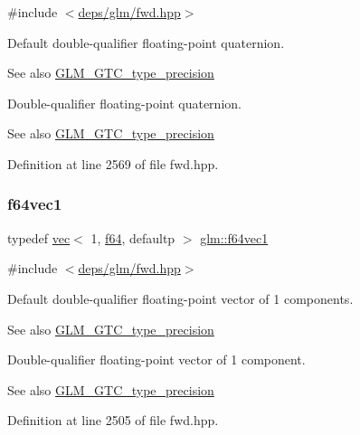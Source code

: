 {\ttfamily \#include $<$\hyperlink{fwd_8hpp}{deps/glm/fwd.\+hpp}$>$}

Default double-\/qualifier floating-\/point quaternion. \begin{DoxySeeAlso}{See also}
\hyperlink{group__gtc__type__precision}{G\+L\+M\+\_\+\+G\+T\+C\+\_\+type\+\_\+precision}
\end{DoxySeeAlso}
Double-\/qualifier floating-\/point quaternion. \begin{DoxySeeAlso}{See also}
\hyperlink{group__gtc__type__precision}{G\+L\+M\+\_\+\+G\+T\+C\+\_\+type\+\_\+precision} 
\end{DoxySeeAlso}


Definition at line 2569 of file fwd.\+hpp.

\mbox{\label{group__gtc__type__precision_ga6478d0530433bb907956a46b2cd99161}} 
\subsubsection{\texorpdfstring{f64vec1}{f64vec1}}
{\footnotesize\ttfamily typedef \hyperlink{structglm_1_1vec}{vec}$<$ 1, \hyperlink{group__gtc__type__precision_ga2bba392e555124b36cde6abba349bab3}{f64}, defaultp $>$ \hyperlink{group__gtc__type__precision_ga6478d0530433bb907956a46b2cd99161}{glm\+::f64vec1}}



{\ttfamily \#include $<$\hyperlink{fwd_8hpp}{deps/glm/fwd.\+hpp}$>$}

Default double-\/qualifier floating-\/point vector of 1 components. \begin{DoxySeeAlso}{See also}
\hyperlink{group__gtc__type__precision}{G\+L\+M\+\_\+\+G\+T\+C\+\_\+type\+\_\+precision}
\end{DoxySeeAlso}
Double-\/qualifier floating-\/point vector of 1 component. \begin{DoxySeeAlso}{See also}
\hyperlink{group__gtc__type__precision}{G\+L\+M\+\_\+\+G\+T\+C\+\_\+type\+\_\+precision} 
\end{DoxySeeAlso}


Definition at line 2505 of file fwd.\+hpp.

\mbox{\label{group__gtc__type__precision_ga6c794781267fd5c810d9a6e7086e02a6}} 
